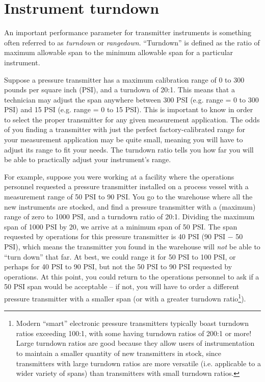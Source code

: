 \filbreak
\section{Instrument turndown}

An important performance parameter for transmitter instruments is something often referred to as \textit{turndown} or \textit{rangedown}.  ``Turndown'' is defined as the ratio of maximum allowable span to the minimum allowable span for a particular instrument.  

Suppose a pressure transmitter has a maximum calibration range of 0 to 300 pounds per square inch (PSI), and a turndown of 20:1.  This means that a technician may adjust the span anywhere between 300 PSI (e.g. range = 0 to 300 PSI) and 15 PSI (e.g. range = 0 to 15 PSI).  This is important to know in order to select the proper transmitter for any given measurement application.  The odds of you finding a transmitter with just the perfect factory-calibrated range for your measurement application may be quite small, meaning you will have to adjust its range to fit your needs.  The turndown ratio tells you how far you will be able to practically adjust your instrument's range.

\vskip 10pt

For example, suppose you were working at a facility where the operations personnel requested a pressure transmitter installed on a process vessel with a measurement range of 50 PSI to 90 PSI.  You go to the warehouse where all the new instruments are stocked, and find a pressure transmitter with a (maximum) range of zero to 1000 PSI, and a turndown ratio of 20:1.  Dividing the maximum span of 1000 PSI by 20, we arrive at a minimum span of 50 PSI.  The span requested by operations for this pressure transmitter is 40 PSI (90 PSI $-$ 50 PSI), which means the transmitter you found in the warehouse will \textit{not} be able to ``turn down'' that far.  At best, we could range it for 50 PSI to 100 PSI, or perhaps for 40 PSI to 90 PSI, but not the 50 PSI to 90 PSI requested by operations.  At this point, you could return to the operations personnel to ask if a 50 PSI span would be acceptable -- if not, you will have to order a different pressure transmitter with a smaller span (or with a greater turndown ratio\footnote{Modern ``smart'' electronic pressure transmitters typically boast turndown ratios exceeding 100:1, with some having turndown ratios of 200:1 or more!  Large turndown ratios are good because they allow users of instrumentation to maintain a smaller quantity of new transmitters in stock, since transmitters with large turndown ratios are more versatile (i.e. applicable to a wider variety of spans) than transmitters with small turndown ratios.}).

